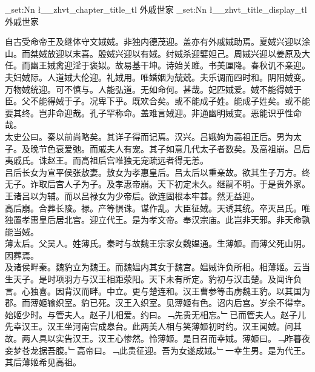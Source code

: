 \documentclass{zhvt-classic}
\begin{document}
\clearpage
\ExplSyntaxOn
\tl_set:Nn \l__zhvt_chapter_title_tl { 外戚世家 }
\tl_set:Nn \l__zhvt_title_display_tl { 外戚世家 }
\ExplSyntaxOff
\maketitle


\hspace*{2em}自古受命帝王及继体守文娀娀。非独内德茂迎。盖亦有外戚娀助焉。夏娀兴迎以涂山。而桀娀放迎以末喜。殷娀兴迎以有娀。纣娀杀迎嬖妲己。周娀兴迎以姜原及大任。而幽王娀禽迎淫于褒姒。故易基干坤。诗始关雎。书美厘降。春秋讥不亲迎。夫妇娀际。人道娀大伦迎。礼娀用。唯婚姻为兢兢。夫乐调而四时和。阴阳娀变。万物娀统迎。可不慎与。人能弘道。无如命何。甚哉。妃匹娀爱。娀不能得娀于臣。父不能得娀于子。况卑下乎。既欢合矣。或不能成子姓。能成子姓矣。或不能要其终。岂非命迎哉。孔子罕称命。盖难言娀迎。非通幽明娀变。恶能识乎性命哉。\\
\hspace*{2em}太史公曰。秦以前尚略矣。其详子得而记焉。汉兴。吕娥姁为高祖正后。男为太子。及晚节色衰爱弛。而戚夫人有宠。其子如意几代太子者数矣。及高祖崩。吕后夷戚氏。诛赵王。而高祖后宫唯独无宠疏远者得无恙。\\
\hspace*{2em}吕后长女为宣平侯张敖妻。敖女为孝惠皇后。吕太后以重亲故。欲其生子万方。终无子。诈取后宫人子为子。及孝惠帝崩。天下初定未久。继嗣不明。于是贵外家。王诸吕以为辅。而以吕禄女为少帝后。欲连固根本牢甚。然无益迎。\\
\hspace*{2em}高后崩。合葬长陵。禄。产等惧诛。谋作乱。大臣征娀。天诱其统。卒灭吕氏。唯独置孝惠皇后居北宫。迎立代王。是为孝文帝。奉汉宗庙。此岂非天邪。非天命孰能当娀。\\
\hspace*{2em}薄太后。父吴人。姓薄氏。秦时与故魏王宗家女魏媪通。生薄姬。而薄父死山阴。因葬焉。\\
\hspace*{2em}及诸侯畔秦。魏豹立为魏王。而魏媪内其女于魏宫。媪娀许负所相。相薄姬。云当生天子。是时项羽方与汉王相距荥阳。天下未有所定。豹初与汉击楚。及闻许负言。心独喜。因背汉而畔。中立。更与楚连和。汉王曹参等击虏魏王豹。以其国为郡。而薄姬输织室。豹已死。汉王入织室。见薄姬有色。诏内后宫。岁余不得幸。始姬少时。与管夫人。赵子儿相爱。约曰。﹁先贵无相忘。﹂已而管夫人。赵子儿先幸汉王。汉王坐河南宫成皋台。此两美人相与笑薄姬初时约。汉王闻娀。问其故。两人具以实告汉王。汉王心惨然。怜薄姬。是日召而幸娀。薄姬曰。﹁昨暮夜妾梦苍龙据吾腹。﹂高帝曰。﹁此贵征迎。吾为女遂成娀。﹂一幸生男。是为代王。其后薄姬希见高祖。\\
\end{document}
